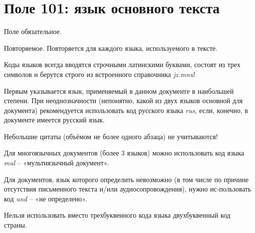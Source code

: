 \chapter{Поле 101: язык основного текста}

Поле обязательное.

Повторяемое. Повторяется для каждого языка, используемого в тексте.

Коды языков всегда вводятся строчными латинскими буквами, состоят из трех символов и берутся строго из встроенного справочника \textit{jz.mnu}!

Первым указывается язык, применяемый в данном документе в наибольшей степени. При неоднозначности (непонятно, какой из двух языков основной для документа) рекомендуется использовать код русского языка \textit{rus}, если, конечно, в документе имеется русский язык.

Небольшие цитаты (объёмом не более одного абзаца) не учитываются!

Для многоязычных документов (более 3 языков) можно использовать код языка \textit{mul} – «мультиязычный документ».

Для документов, язык которого определить невозможно (в том числе по причине отсутствия письменного текста и/или аудиосопровождения), нужно ис-пользовать код \textit{und} – «не определено».

Нельзя использовать вместо трехбуквенного кода языка двухбуквенный код страны.
